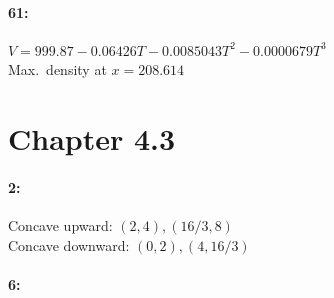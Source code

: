 \documentclass{article}
\begin{document}
    \paragraph*{61:\\}
        $V = 999.87 - 0.06426T - 0.0085043T^2 - 0.0000679T^3$\\
        Max.\ density at $x = 208.614$
    
    \section*{Chapter 4.3}
    \paragraph*{2:\\}
        Concave upward:   $(2, 4), (16/3, 8)$\\
        Concave downward: $(0, 2), (4, 16/3)$\\

        \paragraph{6:\\}

        
    
\end{document}
